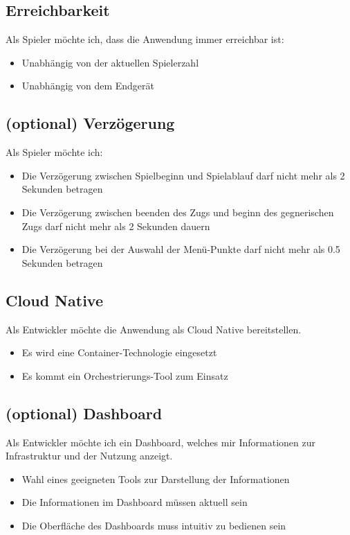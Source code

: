 \documentclass[a4paper, 10pt, conference]{IEEEtran}
\begin{document}
\subsection{Erreichbarkeit}
Als Spieler möchte ich, dass die Anwendung immer erreichbar ist:
\begin{itemize}
	\item Unabhängig von der aktuellen Spielerzahl
	\item Unabhängig von dem Endgerät
\end{itemize}

\subsection{(optional) Verzögerung}
Als Spieler möchte ich:
\begin{itemize}
	\item Die Verzögerung zwischen Spielbeginn und Spielablauf darf nicht mehr als 2 Sekunden betragen
	\item Die Verzögerung zwischen beenden des Zugs und beginn des gegnerischen Zugs darf nicht mehr als 2 Sekunden dauern
	\item Die Verzögerung bei der Auswahl der Menü-Punkte darf nicht mehr als 0.5 Sekunden betragen
\end{itemize}

\subsection{Cloud Native}
Als Entwickler möchte die Anwendung als Cloud Native bereitstellen.
\begin{itemize}
	\item Es wird eine Container-Technologie eingesetzt
	\item Es kommt ein Orchestrierungs-Tool zum Einsatz
\end{itemize}

\subsection{(optional) Dashboard}
Als Entwickler möchte ich ein Dashboard, welches mir Informationen zur Infrastruktur und der Nutzung anzeigt.
\begin{itemize}
	\item Wahl eines geeigneten Tools zur Darstellung der Informationen
	\item Die Informationen im Dashboard müssen aktuell sein
	\item Die Oberfläche des Dashboards muss intuitiv zu bedienen sein
\end{itemize}
\end{document}
